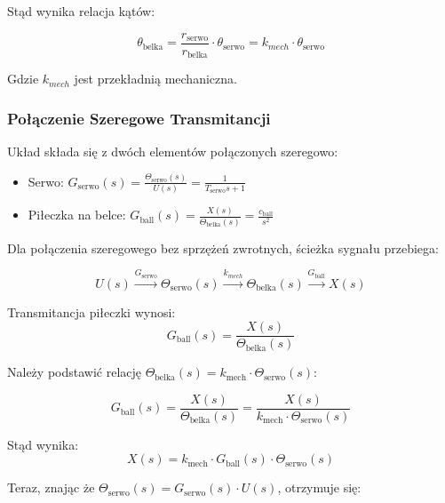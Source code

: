 Stąd wynika relacja kątów:

\begin{equation}
\theta_{\mathrm{belka}} = \frac{r_{\mathrm{serwo}}}{r_{\mathrm{belka}}} \cdot \theta_{\mathrm{serwo}} = k_{mech} \cdot \theta_{\mathrm{serwo}}
\end{equation}

Gdzie $k_{mech}$ jest przekładnią mechaniczna.

\subsubsection{Połączenie Szeregowe Transmitancji}

Układ składa się z dwóch elementów połączonych szeregowo:
\begin{itemize}
  \item Serwo: $G_{\mathrm{serwo}}(s) = \frac{\Theta_{\mathrm{serwo}}(s)}{U(s)} = \frac{1}{T_{\mathrm{serwo}} s + 1}$
  \item Piłeczka na belce: $G_{\mathrm{ball}}(s) = \frac{X(s)}{\Theta_{\mathrm{belka}}(s)} = \frac{c_{\mathrm{ball}}}{s^2}$
\end{itemize}

Dla połączenia szeregowego bez sprzężeń zwrotnych, ścieżka sygnału przebiega:

\begin{equation}
U(s) \xrightarrow{G_{\mathrm{serwo}}} \Theta_{\mathrm{serwo}}(s) \xrightarrow{k_{mech}} \Theta_{\mathrm{belka}}(s) \xrightarrow{G_{\mathrm{ball}}} X(s)
\end{equation}

Transmitancja piłeczki wynosi:
\begin{equation}
G_{\mathrm{ball}}(s) = \frac{X(s)}{\Theta_{\mathrm{belka}}(s)}
\end{equation}

 Należy podstawić 
relację $\Theta_{\mathrm{belka}}(s) = k_{\mathrm{mech}} \cdot \Theta_{\mathrm{serwo}}(s)$:

\begin{equation}
G_{\mathrm{ball}}(s) = \frac{X(s)}{\Theta_{\mathrm{belka}}(s)} = \frac{X(s)}{k_{\mathrm{mech}} \cdot \Theta_{\mathrm{serwo}}(s)} 
\end{equation}

Stąd wynika:
\begin{equation}
X(s) = k_{\mathrm{mech}} \cdot G_{\mathrm{ball}}(s) \cdot \Theta_{\mathrm{serwo}}(s)
\end{equation}

Teraz, znając że $\Theta_{\mathrm{serwo}}(s) = G_{\mathrm{serwo}}(s) \cdot U(s)$, otrzymuje się:

